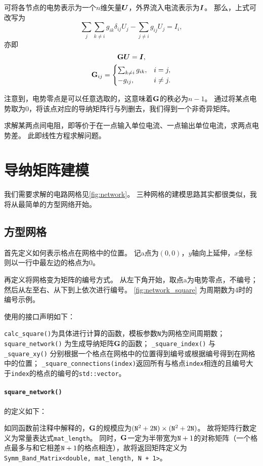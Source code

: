 可将各节点的电势表示为一个$n$维矢量$\vb*{U}$，外界流入电流表示为$\vb*{I}$。
那么，上式可改写为\begin{equation}
    \sum_{j}\sum_{k\neq i}{g_{ik}\delta_{ij}}U_j
        -\sum_{j\neq i}g_{ij}U_j = I_i,
\end{equation}
亦即\begin{gather}
    \vb{G}\vb*{U} = \vb*{I},\\
    \vb{G}_{ij} =
    \begin{cases}
        \sum_{k\neq i}g_{ik},& i=j,\\
        -g_{ij},&   i\neq j.
    \end{cases}
    \label{eq:Gij}
\end{gather}

注意到，电势零点是可以任意选取的，这意味着$\vb{G}$的秩必为$n-1$。
通过将某点电势取为0，将该点对应的导纳矩阵行与列删去，我们得到一个非奇异矩阵。

求解某两点间电阻，即等价于在一点输入单位电流、一点输出单位电流，求两点电势差。
此即线性方程求解问题。

\section{导纳矩阵建模}
我们需要求解的电路网格见\autoref{fig:network}。
三种网格的建模思路其实都很类似，我将从最简单的方型网络开始。

\subsection{方型网格}
首先定义如何表示格点在网格中的位置。
记a点为$(0,0)$，$y$轴向上延伸，$x$坐标则以一行中最左边的格点为0。

再定义将网格变为矩阵的编号方式。
从左下角开始，取点a为电势零点，不编号；然后从左至右、从下到上依次进行编号。
\autoref{fig:network_square} 为周期数为4时的编号示例。

使用的接口声明如下：
{
    \linespread{1.0}
    
}
\verb|calc_square()|为具体进行计算的函数，模板参数\texttt{N}为网格空间周期数；
\verb|square_network()| 为生成导纳矩阵$\vb{G}$的函数；
\verb|_square_index()| 与 \verb|_square_xy()| 分别根据一个格点在网格中的位置得到编号或根据编号得到在网格中的位置；
\verb|_square_connections(index)|返回所有与格点\texttt{index}相连的且编号大于\texttt{index}的格点的编号的\texttt{std::vector}。

\paragraph{\texttt{square\_network()}}\label{para:sq_network}
的定义如下：
{
    \linespread{1.0}
    
}
如同函数前注释中解释的，$\vb{G}$的规模应为$(\text{\texttt{N}}^2+2\text{\texttt{N}})\times(\text{\texttt{N}}^2+2\text{\texttt{N}})$。
故将矩阵行数定义为常量表达式\verb|mat_length|。
同时，$\vb{G}$一定为半带宽为$\text{\texttt{N}}+1$的对称矩阵（一个格点最多与和它相差$\text{\texttt{N}}+1$的格点相连），故将返回矩阵定义为\verb|Symm_Band_Matrix<double, mat_length, N + 1>|。


